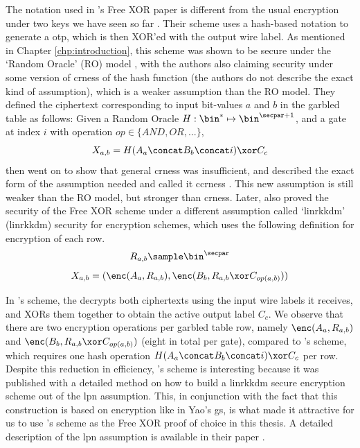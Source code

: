 The notation used in \citeauthor{ALP:KolSch08}'s Free XOR paper is different from the usual encryption under two keys we have seen so far \cite{ALP:KolSch08}. Their scheme uses a hash-based notation to generate a \acrlong{otp}, which is then XOR'ed with the output wire label. As mentioned in Chapter \ref{chp:introduction}, this scheme was shown to be secure under the `Random Oracle' (RO) model \cite{CCS:BelRog93}, with the authors also claiming security under some version of \acrlong{cr}ness of the hash function (the authors do not describe the exact kind of assumption), which is a weaker assumption than the RO model. They defined the ciphertext corresponding to input bit-values $a$ and $b$ in the garbled table as follows: Given a Random Oracle $H: \bin^{*} \mapsto \bin^{\secpar +1}$, and a gate at index $i$ with operation $op\in\{AND,OR,...\}$,
\[X_{a,b} = H(A_a \concat B_b \concat i)\xor C_c\]
\citeauthor{TCC:CKKZ12} then went on to show that general \acrlong{cr}ness was insufficient, and described the exact form of the assumption needed and called it \acrlong{ccr}ness \cite{TCC:CKKZ12}. This new assumption is still weaker than the RO model, but stronger than \acrlong{cr}ness.
Later, \citeauthor{JC:Applebaum16} also proved the security of the Free XOR scheme under a different assumption called `\acrlong{linrkkdm}' (\acrshort{linrkkdm}) security for encryption schemes, which uses the following definition for encryption of each row. 
\[R_{a,b} \sample\bin^{\secpar}\]
\[X_{a,b} = (\enc(A_a, R_{a,b}),\enc(B_b, R_{a,b} \xor C_{op(a,b)}))\]

In \citeauthor{JC:Applebaum16}'s scheme, the \cevaluator decrypts both ciphertexts using the input wire labels it receives, and XORs them together to obtain the active output label $C_c$. We observe that there are two encryption operations per garbled table row, namely $\enc(A_a, R_{a,b})$ and $\enc(B_b, R_{a,b} \xor C_{op(a,b)})$ (eight in total per gate), compared to \citeauthor{ALP:KolSch08}'s scheme, which requires one hash operation $H(A_a \concat B_b \concat i)\xor C_c$ per row. Despite this reduction in efficiency, \citeauthor{JC:Applebaum16}'s scheme is interesting because it was published with a detailed method on how to build a \acrshort{linrkkdm} secure encryption scheme out of the \acrfull{lpn} assumption. This, in conjunction with the fact that this construction is based on encryption like in Yao's \acrlong{gs},  is what made it attractive for us to use \citeauthor{JC:Applebaum16}'s scheme as the Free XOR proof of choice in this thesis. A detailed description of the \acrshort{lpn} assumption is available in their paper \cite{JC:Applebaum16}.

